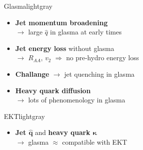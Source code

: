 \documentclass[aspectratio=169,11pt,usenames,dvipsnames]{beamer}
\begin{document}
\begin{frame}
\begin{center}
\begin{columns}
                \begin{center}
                \vspace{5pt}
                \begin{custombox2}{{\color{isgold}\large Glasma}}{lightgray}
                    \footnotesize
                    \begin{varwidth}{0.95\textwidth}
                    \begin{itemize}\itemsep0em 
                        \item {\bfseries\color{palteal}Jet momentum broadening}\\ $\rightarrow$ large $\hat{q}$ in glasma at early times
                        \item {\bfseries\color{palteal}Jet energy loss} without glasma \\$\rightarrow$ $R_{AA}$, $v_2$ $\Rightarrow$ no pre-hydro energy loss
                        \item {\bfseries\color{jyured}Challange} $\rightarrow$ jet quenching in glasma
                        \item {\bfseries\color{palviolet}Heavy quark diffusion}\\ $\rightarrow$ lots of phenomenology in glasma
                    \end{itemize}
                    \end{varwidth}
                \end{custombox2}
                \begin{custombox2}{{\color{palblue}\large EKT}}{lightgray}
                    \footnotesize
                    \begin{varwidth}{0.88\textwidth}
                    \begin{itemize}\itemsep0em 
                        \item {\bfseries\color{palteal}Jet $\boldsymbol{\hat{q}}$} and {\bfseries\color{palviolet}heavy quark $\boldsymbol{\kappa}$}\\ $\rightarrow$ glasma $\approx$ compatible with EKT

\end{itemize}
\end{varwidth}
\end{custombox2}
\end{center}
\end{columns}
\end{center}
\end{frame}
\end{document}
